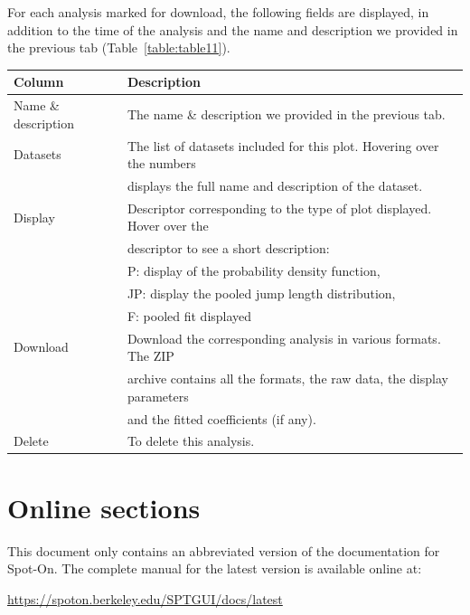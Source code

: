 For each analysis marked for download, the following fields are displayed, in addition to the time of the analysis and the name and description we provided in the previous tab (Table~\ref{table:table11}).

\begin{center}
  \label{table:table11}
\begin{tabular}{ll}
Column & Description\\
\hline
Name \& description & The name \& description we provided in the previous tab.\\
Datasets &
The list of datasets included for this plot. Hovering over the numbers\\& displays the full name and description of the dataset.\\
Display &
Descriptor corresponding to the type of plot displayed. Hover over the\\&
descriptor to see a short description:\\
 & P: display of the probability density function,\\
 & JP: display the pooled jump length distribution,\\
 & F: pooled fit displayed\\
Download &
Download the corresponding analysis in various formats. The ZIP\\&
archive contains all the formats, the raw data, the display parameters\\&
and the fitted coefficients (if any).\\
Delete & To delete this analysis.\\
\end{tabular}
\end{center}

\newpage

\section{Online sections}
This document only contains an abbreviated version of the documentation for Spot-On. The complete manual for the latest version is available online at:\\

\begin{minipage}{0.9\textwidth}
\large{\url{https://spoton.berkeley.edu/SPTGUI/docs/latest}}\\
\end{minipage}

